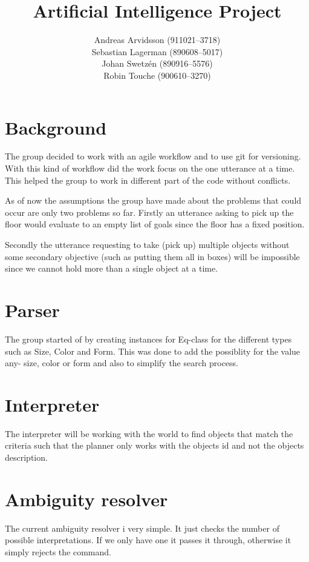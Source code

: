 \documentclass[a4paper]{article}
\title{Artificial Intelligence Project}
\date{}
\author{Andreas Arvidsson (911021--3718) \\
        Sebastian Lagerman (890608--5017) \\
        Johan Swetz\'{e}n (890916--5576) \\
        Robin Touche (900610--3270)}
\begin{document}
\maketitle

\section*{Background}
The group decided to work with an agile workflow and to use git for versioning.
With this kind of workflow did the work focus on the one utterance at a time.
This helped the group to work in different part of the code without conflicts.

As of now the assumptions the group have made about the problems that could
occur are only two problems so far. Firstly an utterance asking to pick up the
floor would evaluate to an empty list of goals since the floor has a fixed
position.

Secondly the utterance requesting to take (pick up) multiple objects
without some secondary objective (such as putting them all in boxes) will be
impossible since we cannot hold more than a single object at a time.

\section*{Parser}
The group started of by creating instances for Eq-class for the different types
such as Size, Color and Form. This was done to add the possiblity for the value
any- size, color or form and also to simplify the search process.

\section*{Interpreter}
The interpreter will be working with the world to find objects that match the
criteria such that the planner only works with the objects id and not the
objects description.

\section*{Ambiguity resolver}
The current ambiguity resolver i very simple. It just checks the number of
possible interpretations. If we only have one it passes it through, otherwise
it simply rejects the command.
\end{document}
